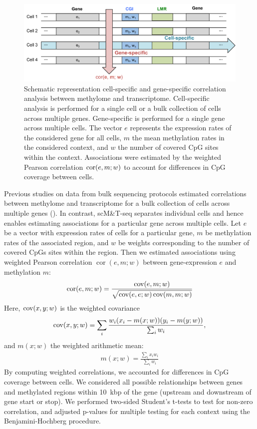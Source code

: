 \begin{figure}[htbp!]
\centering
\includegraphics[width=1.0\textwidth]{method}
\caption[Schematic representation cell-specific and gene-specific correlation analysis between methylome and transcriptome.]{Schematic representation cell-specific and gene-specific correlation analysis between methylome and transcriptome. Cell-specific analysis is performed for a single cell or a bulk collection of cells across multiple genes. Gene-specific is performed for a single gene across multiple cells. The vector $e$ represents the expression rates of the considered gene for all cells, $m$ the mean methylation rates in the considered context, and $w$ the number of covered CpG sites within the context. Associations were estimated by the weighted Pearson correlation $\operatorname{cor}(e, m; w)$ to account for differences in CpG coverage between cells.}
\label{fig:mt_method}
\end{figure}

Previous studies on data from bulk sequencing protocols estimated correlations between methylome and transcriptome for a bulk collection of cells across multiple genes (). In contrast, scM\&T-seq separates individual cells and hence enables estimating associations for a particular gene across multiple cells. Let $e$ be a vector with expression rates of cells for a particular gene, $m$ be methylation rates of the associated region, and $w$ be weights corresponding to the number of covered CpGs sites within the region. Then we estimated associations using weighted Pearson correlation $\operatorname{cor}(e,m;w)$ between gene-expression $e$ and methylation $m$:
\begin{align}
  \operatorname{cor}(e,m;w)=\frac{\operatorname{cov}(e,m;w)}{\sqrt{\operatorname{cov}(e,e;w)\operatorname{cov}(m,m;w)}}
\end{align}
Here, $\operatorname{cov}(x,y;w)$ is the weighted covariance
\begin{align}
  \operatorname{cov}(x,y;w)=\sum_i \frac{w_i (x_i-m(x;w))(y_i-m(y;w))}{\sum_i w_i },
\end{align}
and $m(x;w)$ the weighted arithmetic mean:
\begin{align}
  m(x;w)=\frac{\sum_i x_i w_i}{\sum_i w_i}
\end{align}
By computing weighted correlations, we accounted for differences in CpG coverage between cells. We considered all possible relationships between genes and methylated regions within 10~kbp of the gene (upstream and downstream of gene start or stop). We performed two-sided Student's t-tests to test for non-zero correlation, and adjusted p-values for multiple testing for each context using the Benjamini-Hochberg procedure.

